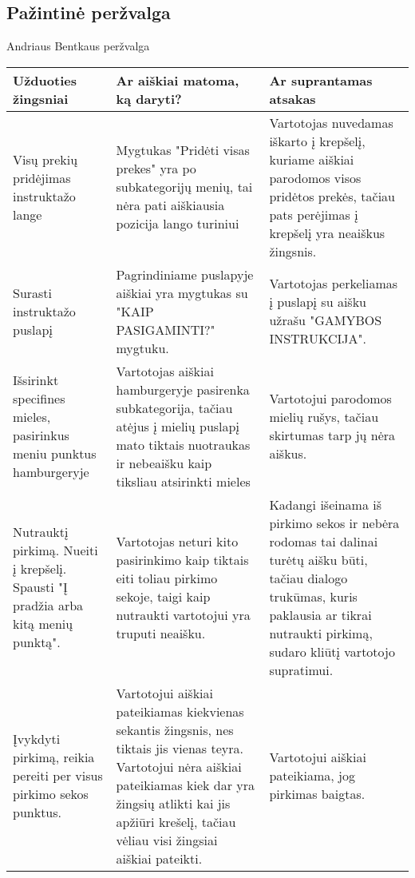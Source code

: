 \documentclass[oneside]{VUMIFPSkursinis}
\begin{document}
	\subsection{Pažintinė peržvalga}
Andriaus Bentkaus peržvalga
\begin{center}
	\begin{tabular}{ |p{3cm}| p{6cm} | p{8cm} | }
		\hline
		Užduoties žingsniai & Ar aiškiai matoma, ką daryti? & Ar suprantamas atsakas \\ \hline

		Visų prekių pridėjimas instruktažo lange &
		Mygtukas "Pridėti visas prekes" yra po subkategorijų menių, tai nėra pati aiškiausia pozicija lango turiniui &
		Vartotojas nuvedamas iškarto į krepšelį, kuriame aiškiai parodomos visos pridėtos prekės, tačiau pats perėjimas į krepšelį yra neaiškus žingsnis.
		\\ \hline

		Surasti instruktažo puslapį &
		Pagrindiniame puslapyje aiškiai yra mygtukas su "KAIP PASIGAMINTI?" mygtuku. &
		Vartotojas perkeliamas į puslapį su aišku užrašu "GAMYBOS INSTRUKCIJA".
		\\ \hline

		Išsirinkt specifines mieles, pasirinkus meniu punktus hamburgeryje &
		Vartotojas aiškiai hamburgeryje pasirenka subkategorija, tačiau atėjus į mielių puslapį mato tiktais nuotraukas ir nebeaišku kaip tiksliau atsirinkti mieles &
		Vartotojui parodomos mielių rušys, tačiau skirtumas tarp jų nėra aiškus.
		\\ \hline

		Nutrauktį pirkimą.
		Nueiti į krepšelį.
		Spausti "Į pradžia arba kitą menių punktą". &
		Vartotojas neturi kito pasirinkimo kaip tiktais eiti toliau pirkimo sekoje, taigi kaip nutraukti vartotojui yra truputi neaišku. &
		Kadangi išeinama iš pirkimo sekos ir nebėra rodomas tai dalinai turėtų aišku būti, tačiau dialogo trukūmas, kuris paklausia ar tikrai nutraukti pirkimą, sudaro kliūtį vartotojo supratimui.
		\\ \hline

		Įvykdyti pirkimą, reikia pereiti per visus pirkimo sekos punktus. &
		Vartotojui aiškiai pateikiamas kiekvienas sekantis žingsnis, nes tiktais jis vienas teyra. Vartotojui nėra aiškiai pateikiamas kiek dar yra žingsių atlikti kai jis apžiūri krešelį, tačiau vėliau visi žingsiai aiškiai pateikti. &
		Vartotojui aiškiai pateikiama, jog pirkimas baigtas.
		\\ \hline
	\end{tabular}
\end{center}
\end{document}
